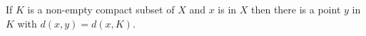If $K$ is a non-empty compact subset of $X$ and $x$ is in $X$ then there is a point $y$ in $K$ with $d(x, y) = d(x, K)$.